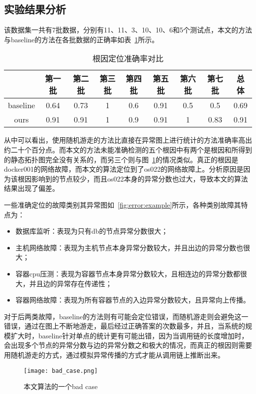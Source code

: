 \subsection{实验结果分析}
该数据集一共有7批数据，分别有11、11、3、10、10、6和5个测试点，本文的方法与baseline的方法在各批数据的正确率如表~\ref{tab:rca:result}所示。

\begin{table}[htbp]
  \centering
  \begin{tabular}{ccccccccc}
    \toprule
      & 第一批 & 第二批 & 第三批 & 第四批 & 第五批 &第六批 & 第七批& 总体\\
    \midrule
    baseline & 0.64 & 0.73 & 1& 0.6 & 0.91 & 0.5 &0.5  & 0.69\\
    ours &  0.91 & 0.91 & 1 & 0.9 & 0.91 &1 & 0.83 & 0.91\\
    \bottomrule
  \end{tabular}
  \caption{根因定位准确率对比}
  \label{tab:rca:result}
\end{table}

从中可以看出，使用随机游走的方法比直接在异常图上进行统计的方法准确率高出约二十个百分点。而本文的方法未能准确检测的五个根因中有两个是根因和所得到的静态拓扑图完全没有关系的，而另三个则与图~\ref{fig:bad:case}的情况类似。真正的根因是docker001的网络故障，而本文的算法定位到了os022的网络故障上。分析原因是因为该根因影响到的节点较少，而且os022本身的异常分数也过大，导致本文的算法结果出现了偏差。


一些准确定位的故障类别其异常图如~\ref{fig:error:example}所示，各种类别故障其特点为：
\begin{itemize}
  \item 数据库监听：表现为只有db的节点异常分数很大；
  \item 主机网络故障：表现为主机节点本身异常分数较大，并且出边的异常分数也很大；
  \item 容器cpu压测：表现为容器节点本身异常分数较大，且相连边的异常分数都很大，并且边的异常存在传递性；
  \item 容器网络故障：表现为所有容器节点的入边异常分数较大，且异常向上传播。
\end{itemize}

对于后两类故障，baseline的方法则有可能会定位错误，而随机游走则会避免这一错误，通过在图上不断地游走，最后经过正确答案的次数最多，并且，当系统的规模扩大时，baseline针对单点的统计更有可能出错，因为当调用链的长度增加时，会出现多个节点的异常分数与边的异常分数之和极大的情况，而真正的根因则需要用随机游走的方式，通过模拟异常传播的方式才能从调用链上推断出来。
\begin{figure}[htbp]
  \centering
  \texttt{[image: bad\_case.png]}
  \caption{本文算法的一个bad case}
  \label{fig:bad:case}
\end{figure}

